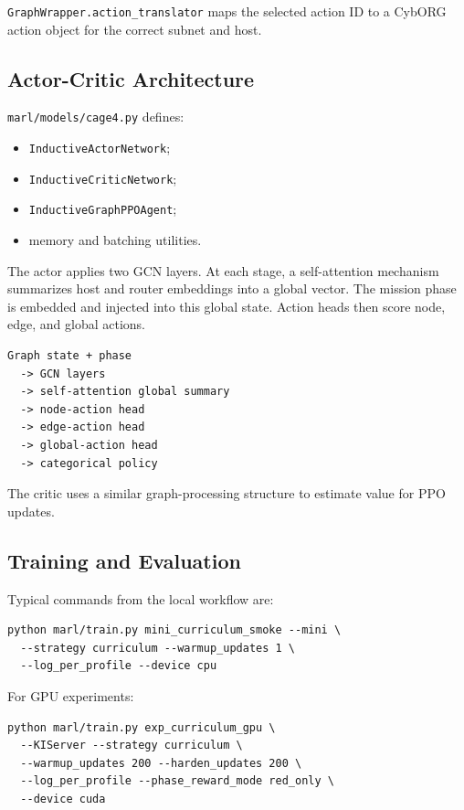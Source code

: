 \texttt{GraphWrapper.action\_translator} maps the selected action ID to a CybORG action object for the correct subnet and host.

\subsection{Actor-Critic Architecture}

\texttt{marl/models/cage4.py} defines:

\begin{itemize}
  \item \texttt{InductiveActorNetwork};
  \item \texttt{InductiveCriticNetwork};
  \item \texttt{InductiveGraphPPOAgent};
  \item memory and batching utilities.
\end{itemize}

The actor applies two GCN layers. At each stage, a self-attention mechanism summarizes host and router embeddings into a global vector. The mission phase is embedded and injected into this global state. Action heads then score node, edge, and global actions.

\begin{lstlisting}
Graph state + phase
  -> GCN layers
  -> self-attention global summary
  -> node-action head
  -> edge-action head
  -> global-action head
  -> categorical policy
\end{lstlisting}

The critic uses a similar graph-processing structure to estimate value for PPO updates.

\subsection{Training and Evaluation}

Typical commands from the local workflow are:

\begin{lstlisting}
python marl/train.py mini_curriculum_smoke --mini \
  --strategy curriculum --warmup_updates 1 \
  --log_per_profile --device cpu
\end{lstlisting}

For GPU experiments:

\begin{lstlisting}
python marl/train.py exp_curriculum_gpu \
  --KIServer --strategy curriculum \
  --warmup_updates 200 --harden_updates 200 \
  --log_per_profile --phase_reward_mode red_only \
  --device cuda
\end{lstlisting}

